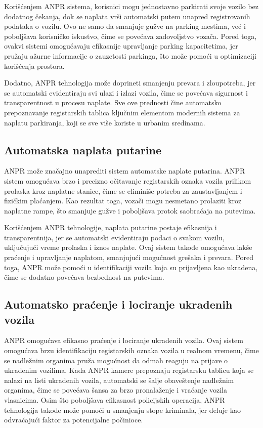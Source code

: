 \documentclass[a4paper,12pt]{article}
\begin{document}
	Korišćenjem ANPR sistema, korisnici mogu jednostavno parkirati svoje vozilo bez dodatnog čekanja, dok se naplata vrši automatski putem unapred registrovanih podataka o vozilu. Ovo ne samo da smanjuje gužve na parking mestima, već i poboljšava korisničko iskustvo, čime se povećava zadovoljstvo vozača. Pored toga, ovakvi sistemi omogućavaju efikasnije upravljanje parking kapacitetima, jer pružaju ažurne informacije o zauzetosti parkinga, što može pomoći u optimizaciji korišćenja prostora. 
	
	Dodatno, ANPR tehnologija može doprineti smanjenju prevara i zloupotreba, jer se automatski evidentiraju svi ulazi i izlazi vozila, čime se povećava sigurnost i transparentnost u procesu naplate. Sve ove prednosti čine automatsko prepoznavanje registarskih tablica ključnim elementom modernih sistema za naplatu parkiranja, koji se sve više koriste u urbanim sredinama.
	
	\subsection{Automatska naplata putarine}
	ANPR može značajno unaprediti sistem automatske naplate putarina. ANPR sistem omogućava brzo i precizno očitavanje registarskih oznaka vozila prilikom prolaska kroz naplatne stanice, čime se eliminiše potreba za zaustavljanjem i fizičkim plaćanjem. Kao rezultat toga, vozači mogu nesmetano prolaziti kroz naplatne rampe, što smanjuje gužve i poboljšava protok saobraćaja na putevima.
	
	Korišćenjem ANPR tehnologije, naplata putarine postaje efikasnija i transparentnija, jer se automatski evidentiraju podaci o svakom vozilu, uključujući vreme prolaska i iznos naplate. Ovaj sistem takođe omogućava lakše praćenje i upravljanje naplatom, smanjujući mogućnost grešaka i prevara. Pored toga, ANPR može pomoći u identifikaciji vozila koja su prijavljena kao ukradena, čime se dodatno povećava bezbednost na putevima.
	
	\subsection{Automatsko praćenje i lociranje ukradenih vozila}
	ANPR omogućava efikasno praćenje i lociranje ukradenih vozila. Ovaj sistem omogućava brzu identifikaciju registarskih oznaka vozila u realnom vremenu, čime se nadležnim organima pruža mogućnost da odmah reaguju na prijave o ukradenim vozilima. Kada ANPR kamere prepoznaju registarsku tablicu koja se nalazi na listi ukradenih vozila, automatski se šalje obaveštenje nadležnim organima, čime se povećava šansa za brzo pronalaženje i vraćanje vozila vlasnicima. Osim što poboljšava efikasnost policijskih operacija, ANPR tehnologija takođe može pomoći u smanjenju stope kriminala, jer deluje kao odvraćajući faktor za potencijalne počinioce.
	
\end{document}
